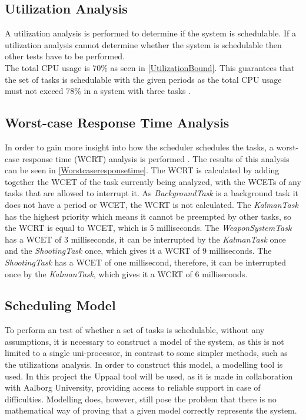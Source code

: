 

\subsection{Utilization Analysis}
A utilization analysis \cite[slide 14]{utilization} is performed to determine if the system is schedulable. If a utilization analysis cannot determine whether the system is schedulable then other tests have to be performed. \\

The total CPU usage is 70\% as seen in \cref{UtilizationBound}. This guarantees that the set of tasks is schedulable with the given periods as the total CPU usage must not exceed 78\% in a system with three tasks \cite{utilization}.


\medskip

\subsection{Worst-case Response Time Analysis}
In order to gain more insight into how the scheduler schedules the tasks, a worst-case response time (WCRT) analysis is performed \cite[slide 24-25]{utilization}. The results of this analysis can be seen in \cref{Worstcaseresponsetime}. The WCRT is calculated by adding together the WCET of the task currently being analyzed, with the WCETs of any tasks that are allowed to interrupt it. As \emph{BackgroundTask} is a background task it does not have a period or WCET, the WCRT is not calculated. The \emph{KalmanTask} has the highest priority which means it cannot be preempted by other tasks, so the WCRT is equal to WCET, which is 5 milliseconds. The \emph{WeaponSystemTask} has a WCET of 3 milliseconds, it can be interrupted by the \emph{KalmanTask} once and the \emph{ShootingTask} once, which gives it a WCRT of 9 milliseconds. The \emph{ShootingTask} has a WCET of one millisecond, therefore, it can be interrupted once by the \emph{KalmanTask}, which gives it a WCRT of 6 milliseconds.


\medskip

\subsection{Scheduling Model}
To perform an test of whether a set of tasks is schedulable, without any assumptions, it is necessary to construct a model of the system, as this is not limited to a single uni-processor, in contrast to some simpler methods, such as the utilizations analysis. In order to construct this model, a modelling tool is used. In this project the Uppaal tool will be used, as it is made in collaboration with Aalborg University, providing access to reliable support in case of difficulties. Modelling does, however, still pose the problem that there is no mathematical way of proving that a given model correctly represents the system.

